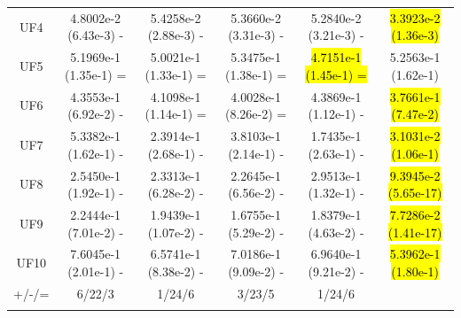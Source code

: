\documentclass[journal]{IEEEtran}
\begin{document}
\begin{table}[tbp]
\begin{tabular}{cccccc}
        UF4     & 4.8002e-2 (6.43e-3) -      & 5.4258e-2 (2.88e-3) -      & 5.3660e-2 (3.31e-3) - & 5.2840e-2 (3.21e-3) -      & \hl{3.3923e-2 (1.36e-3)}  \\
        UF5     & 5.1969e-1 (1.35e-1) =      & 5.0021e-1 (1.33e-1) =      & 5.3475e-1 (1.38e-1) = & \hl{4.7151e-1 (1.45e-1) =} & 5.2563e-1 (1.62e-1)       \\
        UF6     & 4.3553e-1 (6.92e-2) -      & 4.1098e-1 (1.14e-1) =      & 4.0028e-1 (8.26e-2) = & 4.3869e-1 (1.12e-1) -      & \hl{3.7661e-1 (7.47e-2)}  \\
        UF7     & 5.3382e-1 (1.62e-1) -      & 2.3914e-1 (2.68e-1) -      & 3.8103e-1 (2.14e-1) - & 1.7435e-1 (2.63e-1) -      & \hl{3.1031e-2 (1.06e-1)}  \\
        UF8     & 2.5450e-1 (1.92e-1) -      & 2.3313e-1 (6.28e-2) -      & 2.2645e-1 (6.56e-2) - & 2.9513e-1 (1.32e-1) -      & \hl{9.3945e-2 (5.65e-17)} \\
        UF9     & 2.2444e-1 (7.01e-2) -      & 1.9439e-1 (1.07e-2) -      & 1.6755e-1 (5.29e-2) - & 1.8379e-1 (4.63e-2) -      & \hl{7.7286e-2 (1.41e-17)} \\
        UF10    & 7.6045e-1 (2.01e-1) -      & 6.5741e-1 (8.38e-2) -      & 7.0186e-1 (9.09e-2) - & 6.9640e-1 (9.21e-2) -      & \hl{5.3962e-1 (1.80e-1)}  \\
        \hline
        +/-/=   & 6/22/3                     & 1/24/6                     & 3/23/5                & 1/24/6                     &                           \\
        \label{tab:igd_ops}
    \end{tabular}
\end{table}
\end{document}
